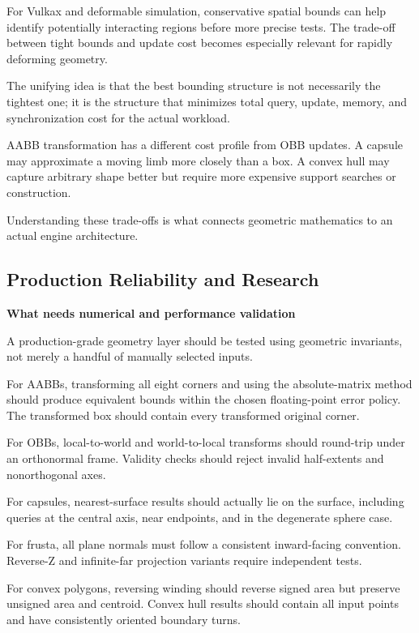 For Vulkax and deformable simulation, conservative spatial bounds can help identify potentially interacting regions before more precise tests. The trade-off between tight bounds and update cost becomes especially relevant for rapidly deforming geometry.

The unifying idea is that the best bounding structure is not necessarily the tightest one; it is the structure that minimizes total query, update, memory, and synchronization cost for the actual workload.

AABB transformation has a different cost profile from OBB updates. A capsule may approximate a moving limb more closely than a box. A convex hull may capture arbitrary shape better but require more expensive support searches or construction.

Understanding these trade-offs is what connects geometric mathematics to an actual engine architecture.

\subsection{Production Reliability and Research}\label{04-visual-computing-ii-ch022-production-reliability-and-research}

\hypertarget{04-visual-computing-ii-ch022-production-reliability-and-research}{}

\textbf{What needs numerical and performance validation}

A production-grade geometry layer should be tested using geometric invariants, not merely a handful of manually selected inputs.

For AABBs, transforming all eight corners and using the absolute-matrix method should produce equivalent bounds within the chosen floating-point error policy. The transformed box should contain every transformed original corner.

For OBBs, local-to-world and world-to-local transforms should round-trip under an orthonormal frame. Validity checks should reject invalid half-extents and nonorthogonal axes.

For capsules, nearest-surface results should actually lie on the surface, including queries at the central axis, near endpoints, and in the degenerate sphere case.

For frusta, all plane normals must follow a consistent inward-facing convention. Reverse-Z and infinite-far projection variants require independent tests.

For convex polygons, reversing winding should reverse signed area but preserve unsigned area and centroid. Convex hull results should contain all input points and have consistently oriented boundary turns.


